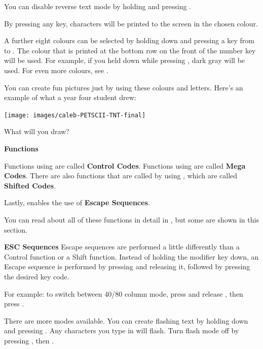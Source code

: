 You can disable reverse text mode by holding  and pressing .

By pressing any key, characters will be printed to the screen in the chosen colour.

A further eight colours can be selected by holding down \megasymbolkey and pressing a key from  to .
The colour that is printed at the bottom row on the front of the number key will be used. For example, if you held
\megasymbolkey down while pressing , dark gray will be used. For even more colours, see .

\needspace{4cm}
You can create fun pictures just by using these colours and letters.  Here's an example of what a year four student drew:

\begin{center}
\texttt{[image: images/caleb-PETSCII-TNT-final]}
\end{center}

What will you draw?

\needspace{2cm}
\textbf{Functions}

Functions using  are called \textbf{Control Codes}.
Functions using \megasymbolkey are called \textbf{Mega Codes}. There are also functions that are called by using , which
are called \textbf{Shifted Codes}.

Lastly,  enables the use of \textbf{Escape Sequences}.

You can read about all of these functions in detail in , but some are shown in this section.


\needspace{2cm}
\textbf{ESC Sequences}
Escape sequences are performed a little differently than a Control function or a Shift function. Instead of holding the modifier key down, an Escape sequence is performed by pressing  and releasing it, followed by pressing the desired key code.

For example: to switch between 40/80 column mode, press and release , then press .

There are more modes available. You can create flashing text by holding  down and pressing . Any characters you type in will flash. Turn flash mode off by pressing ,  then .



